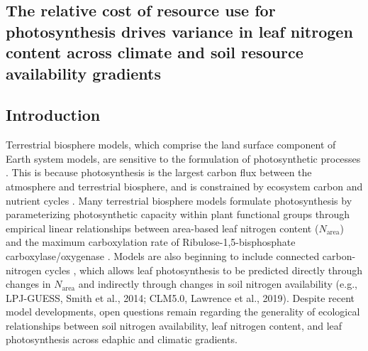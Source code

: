 \begin{singlespace}
    \chapter{\textbf{The relative cost of resource use for photosynthesis drives variance in leaf nitrogen content across climate and soil resource availability gradients}}
\end{singlespace}

\section{Introduction}
Terrestrial biosphere models, which comprise the land surface component of Earth system models, are sensitive to the formulation of photosynthetic processes . This is because photosynthesis is the largest carbon flux between the atmosphere and terrestrial biosphere, and is constrained by ecosystem carbon and nutrient cycles . Many terrestrial biosphere models formulate photosynthesis by parameterizing photosynthetic capacity within plant functional groups through empirical linear relationships between area-based leaf nitrogen content ($N_\mathrm{area}$) and the maximum carboxylation rate of Ribulose-1,5-bisphosphate carboxylase/oxygenase . Models are also beginning to include connected carbon-nitrogen cycles , which allows leaf photosynthesis to be predicted directly through changes in $N_{\mathrm{area}}$ and indirectly through changes in soil nitrogen availability (e.g., LPJ-GUESS, Smith et al., 2014; CLM5.0, Lawrence et al., 2019). Despite recent model developments, open questions remain regarding the generality of ecological relationships between soil nitrogen availability, leaf nitrogen content, and leaf photosynthesis across edaphic and climatic gradients.

